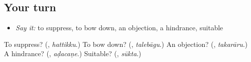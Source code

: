 \subsection*{Your turn}
\begin{itemize}
\raggedright
  \item \emph{Say it:} to suppress, to bow down, an objection, a hindrance, suitable
\end{itemize}

\begin{tcolorbox}[breakable,colback=teal!4,colframe=teal!35!black,title={Before you move on}]
To suppress? (\textbf{}, \emph{hattikku}.) To bow down? (\textbf{}, \emph{talebāgu}.) An objection? (\textbf{}, \emph{takarāru}.) A hindrance? (\textbf{}, \emph{aḍacaṇe}.) Suitable? (\textbf{}, \emph{sūkta}.)
\end{tcolorbox}
